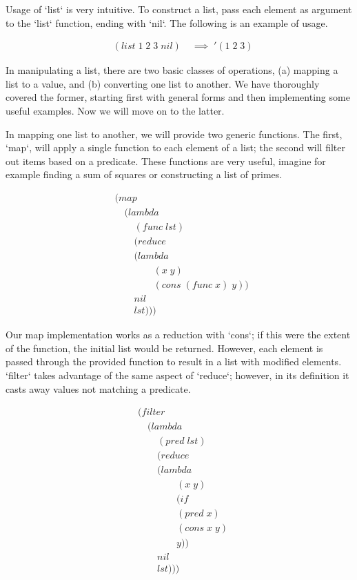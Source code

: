 Usage of `list` is very intuitive. To construct a list, pass each element as 
argument to the `list` function, ending with `nil`. The following is an example of 
usage.   

\begin{align*}
& (list \; 1 \; 2 \; 3 \; nil) \; &\implies \; '(1 \; 2 \; 3)
\end{align*}

In manipulating a list, there are two basic classes of operations, (a) mapping a 
list to a value, and (b) converting one list to another. We have thoroughly 
covered the former, starting first with general forms and then implementing some 
useful examples. Now we will move on to the latter.

In mapping one list to another, we will provide two generic functions. The first, 
`map`, will apply a single function to each element of a list; the second will 
filter out items based on a predicate. These functions are very useful, imagine 
for example finding a sum of squares or constructing a list of primes.

\begin{align*}
& (map \; 
\\& \quad (lambda \; 
\\& \qquad (func \; lst)
\\& \qquad (reduce
\\& \qquad (lambda \; 
\\& \qquad \qquad (x \; y) \; 
\\& \qquad \qquad (cons \; (func \; x) \; y)) \; 
\\& \qquad nil
\\& \qquad lst)))
\end{align*}

Our map implementation works as a reduction with `cons`; if this were the extent 
of the function, the initial list would be returned. However, each element is 
passed through the provided function to result in a list with modified elements. 
`filter` takes advantage of the same aspect of `reduce`; however, in its 
definition it casts away values not matching a predicate.

\begin{align*}
& (filter \; 
\\& \quad (lambda \; 
\\& \qquad (pred \; lst)
\\& \qquad (reduce
\\& \qquad (lambda \; 
\\& \qquad \qquad (x \; y)
\\& \qquad \qquad (if
\\& \qquad \qquad (pred \; x)
\\& \qquad \qquad (cons \; x \; y)
\\& \qquad \qquad y))
\\& \qquad nil
\\& \qquad lst)))
\end{align*}

